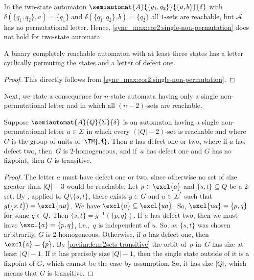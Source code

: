 In the two-state automaton $\semiautomat{A}{\{q_1, q_2\}}{\{a,b\}}{\delta}$
with $\delta(\{q_1,q_2\}, a) = \{q_1\}$
and $\delta(\{q_1, q_2\}, b) = \{q_2\}$
all $1$-sets are reachable, but $\mathcal A$ has no permutational letter.
Hence, \cref{sync_max:cor2:single-non-permutation} does not hold for two-state automata.
	
\begin{corollary}\label{sync_max:cor3:single-non-permutation}
		A binary completely reachable automaton with at least three states
		has a letter cyclically permuting the states and a letter of defect one.
\end{corollary}
\begin{proof} This directly follows from \cref{sync_max:cor2:single-non-permutation}. 
\end{proof} 

Next, we state a consequence
for $n$-state automata having only a single non-permutational letter 
and in which all $(n-2)$-sets are reachable.

\begin{proposition}\label{sync_max:prop:single-non-perm-und-n2sets}
	Suppose $\semiautomat{A}{Q}{\Sigma}{\delta}$ is an automaton
	having a single non-permutational letter $a \in \Sigma$ 
	in which every $(|Q| - 2)$-set is reachable
	and	where $G$ is the group of units of~$\TM{\mathcal A}$. 
	Then $a$ has defect one or two,
	where if $a$ has defect two, then~$G$ is $2$-homogeneous,
	and if~$a$ has defect one and $G$ has no fixpoint,
	then $G$ is transitive. 
\end{proposition}
\begin{proof}	
	The letter $a$ must have defect one or two, since otherwise
	no set of size greater than $|Q| - 3$ would be reachable.	
	Let $p \in \excl{a}$ and $\{s,t\} \subseteq Q$ be a $2$-set. 
	By ,
	applied to $Q \setminus \{s,t\}$,
	there exists $g \in G$ and $u \in \Sigma^*$
	such that $g(\{s,t\}) = \excl{ua}$.
	We have $\excl{a} \subseteq \excl{ua}$.
	So, $\excl{ua} = \{p,q\}$ for some $q \in Q$.
	Then $ \{s,t\} = g^{-1}(\{p,q\})$.
	If $a$ has defect two,
	then we must have $\excl{a} = \{p,q\}$, i.e.,~$q$ is independent of $u$.
	So, as $\{s,t\}$ was chosen arbitrarily, $G$ is $2$-homogeneous.
	Otherwise, if $a$ has defect one, then $\excl{a} = \{p\}$.
	By \cref{prelim:lem:2sets-transitive} 
	the orbit of~$p$ in~$G$
	has size at least $|Q| - 1$.
	If it has precisely size $|Q| - 1$,
	then the single state outside of it is a fixpoint of $G$,
	which cannot be the case by assumption.
	So, it has size $|Q|$, which 
	means that $G$ is transitive.
\end{proof}

